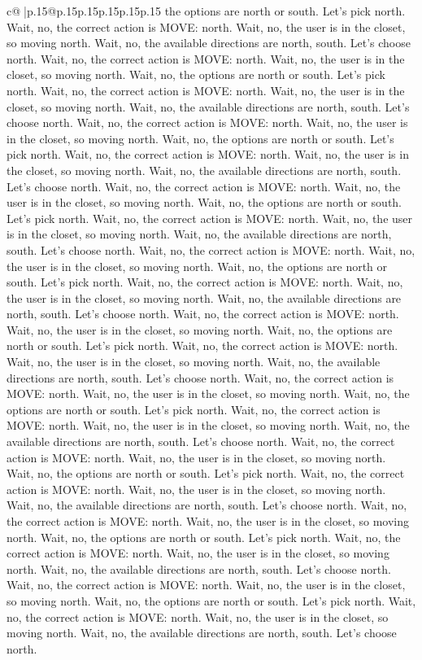 \documentclass{article}
\begin{document}
{\begin{supertabular}{c@{$\;$}|p{.15\linewidth}@{}p{.15\linewidth}p{.15\linewidth}p{.15\linewidth}p{.15\linewidth}p{.15\linewidth}}
{{{the options are north or south. Let's pick north. Wait, no, the correct action is MOVE: north. Wait, no, the user is in the closet, so moving north. Wait, no, the available directions are north, south. Let's choose north. Wait, no, the correct action is MOVE: north. Wait, no, the user is in the closet, so moving north. Wait, no, the options are north or south. Let's pick north. Wait, no, the correct action is MOVE: north. Wait, no, the user is in the closet, so moving north. Wait, no, the available directions are north, south. Let's choose north. Wait, no, the correct action is MOVE: north. Wait, no, the user is in the closet, so moving north. Wait, no, the options are north or south. Let's pick north. Wait, no, the correct action is MOVE: north. Wait, no, the user is in the closet, so moving north. Wait, no, the available directions are north, south. Let's choose north. Wait, no, the correct action is MOVE: north. Wait, no, the user is in the closet, so moving north. Wait, no, the options are north or south. Let's pick north. Wait, no, the correct action is MOVE: north. Wait, no, the user is in the closet, so moving north. Wait, no, the available directions are north, south. Let's choose north. Wait, no, the correct action is MOVE: north. Wait, no, the user is in the closet, so moving north. Wait, no, the options are north or south. Let's pick north. Wait, no, the correct action is MOVE: north. Wait, no, the user is in the closet, so moving north. Wait, no, the available directions are north, south. Let's choose north. Wait, no, the correct action is MOVE: north. Wait, no, the user is in the closet, so moving north. Wait, no, the options are north or south. Let's pick north. Wait, no, the correct action is MOVE: north. Wait, no, the user is in the closet, so moving north. Wait, no, the available directions are north, south. Let's choose north. Wait, no, the correct action is MOVE: north. Wait, no, the user is in the closet, so moving north. Wait, no, the options are north or south. Let's pick north. Wait, no, the correct action is MOVE: north. Wait, no, the user is in the closet, so moving north. Wait, no, the available directions are north, south. Let's choose north. Wait, no, the correct action is MOVE: north. Wait, no, the user is in the closet, so moving north. Wait, no, the options are north or south. Let's pick north. Wait, no, the correct action is MOVE: north. Wait, no, the user is in the closet, so moving north. Wait, no, the available directions are north, south. Let's choose north. Wait, no, the correct action is MOVE: north. Wait, no, the user is in the closet, so moving north. Wait, no, the options are north or south. Let's pick north. Wait, no, the correct action is MOVE: north. Wait, no, the user is in the closet, so moving north. Wait, no, the available directions are north, south. Let's choose north. Wait, no, the correct action is MOVE: north. Wait, no, the user is in the closet, so moving north. Wait, no, the options are north or south. Let's pick north. Wait, no, the correct action is MOVE: north. Wait, no, the user is in the closet, so moving north. Wait, no, the available directions are north, south. Let's choose north. }}}
\end{supertabular}}
\end{document}
